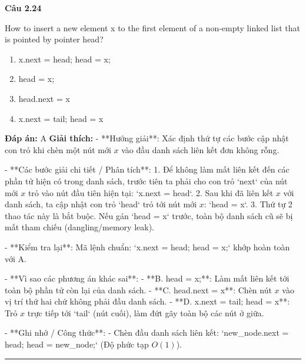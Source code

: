 \documentclass[11pt,a4paper]{article}
\newenvironment{question}[1]{%
  \par\vspace{1em}\noindent\textbf{\large Câu #1}\par\vspace{0.4em}
}{%
  \par\vspace{1em}\hrule\vspace{0.6em}
}
\newenvironment{choices}{%
  \begin{enumerate}[label=\textbf{\Alph*.},leftmargin=2.2em,itemsep=2pt,topsep=3pt]
}{%
  \end{enumerate}
}
\newcommand{\choice}{\item}
\begin{document}
\begin{question}{2.24}
How to insert a new element x to the first element of a non-empty linked list that is pointed by pointer head?
\begin{choices}
\choice x.next = head; head = x;
\choice head = x;
\choice head.next = x
\choice x.next = tail; head = x
\end{choices}
\textbf{Đáp án:} A
\textbf{Giải thích:} - **Hướng giải**:
  Xác định thứ tự các bước cập nhật con trỏ khi chèn một nút mới \(x\) vào đầu danh sách liên kết đơn không rỗng.

- **Các bước giải chi tiết / Phân tích**:
  1. Để không làm mất liên kết đến các phần tử hiện có trong danh sách, trước tiên ta phải cho con trỏ `next` của nút mới \(x\) trỏ vào nút đầu tiên hiện tại: `x.next = head`.
  2. Sau khi đã liên kết \(x\) với danh sách, ta cập nhật con trỏ `head` trỏ tới nút mới \(x\): `head = x`.
  3. Thứ tự 2 thao tác này là bắt buộc. Nếu gán `head = x` trước, toàn bộ danh sách cũ sẽ bị mất tham chiếu (dangling/memory leak).

- **Kiểm tra lại**:
  Mã lệnh chuẩn: `x.next = head; head = x;` khớp hoàn toàn với A.

- **Vì sao các phương án khác sai**:
  - **B. head = x;**: Làm mất liên kết tới toàn bộ phần tử còn lại của danh sách.
  - **C. head.next = x**: Chèn nút \(x\) vào vị trí thứ hai chứ không phải đầu danh sách.
  - **D. x.next = tail; head = x**: Trỏ \(x\) trực tiếp tới `tail` (nút cuối), làm đứt gãy toàn bộ các nút ở giữa.

- **Ghi nhớ / Công thức**:
  - Chèn đầu danh sách liên kết: `new_node.next = head; head = new_node;` (Độ phức tạp \(O(1)\)).
\end{question}
\end{document}
